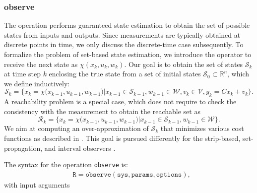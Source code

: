 \subsubsection{observe} \label{sec:observe}

The operation  performs guaranteed state estimation to obtain the set of possible states from inputs and outputs. Since measurements are typically obtained at discrete points in time, we only discuss the discrete-time case subsequently. To formalize the problem of set-based state estimation, we introduce the operator to receive the next state as $\chi(x_k,u_k,w_k)$. Our goal is to obtain the set of states $\mathcal{S}_{k}$ at time step $k$ enclosing the true state from a set of initial states $\mathcal{S}_0 \subset \mathbb{R}^n$, which we define inductively:
\begin{equation*}
\mathcal{S}_{k} = \Big\{x_k = \chi\Big(x_{k-1},u_{k-1},w_{k-1}\Big) \Big|  x_{k-1} \in \mathcal{S}_{k-1}, w_{k-1} \in \mathcal{W}, v_{k} \in \mathcal{V}, y_{k} = C x_k + v_{k} \Big\}.
\end{equation*}
A reachability problem is a special case, which does not require to check the consistency with the measurement to obtain the reachable set as
\begin{equation*}
\mathcal{R}_{k} = \Big\{x_k =\chi\Big(x_{k-1},u_{k-1},w_{k-1}\Big) \Big| x_{k-1} \in \mathcal{S}_{k-1}, w_{k-1} \in \mathcal{W} \Big\}.
\end{equation*}
We aim at computing an over-approximation of $\mathcal{S}_{k}$ that minimizes various cost functions as described in \cite{Althoff2021c, Althoff2021d}. This goal is pursued differently for the strip-based, set-propagation, and interval observers \cite{Althoff2021c, Althoff2021d}.

The syntax for the operation \texttt{observe} is:
\begin{equation*}
\begin{split}
	& \texttt{R} = \texttt{observe}(\texttt{sys},\texttt{params},\texttt{options}),
\end{split}
\end{equation*}
with input arguments

